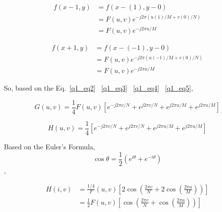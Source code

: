 \documentclass[12pt]{article}
\begin{document}
\begin{enumerate}[leftmargin=\labelsep]
\begin{enumerate}
        \begin{equation}
            \begin{aligned}
                f(x -1, y) 
                &= f(x-(1), y-0)\\
                &= F(u, v)e^{-j2\pi(u(1)/M + v(0)/N)}\\
                &= F(u, v)e^{-j2\pi u/M}
            \label{q1_eq4}
            \end{aligned}
        \end{equation}


        \begin{equation}
            \begin{aligned}
                f(x +1, y) 
                &= f(x-(-1), y-0)\\
                &= F(u, v)e^{-j2\pi(u(-1)/M + v(0)/N)}\\
                &= F(u, v)e^{-j2\pi u/M}
            \label{q1_eq5}
            \end{aligned}
        \end{equation}
        
        So, based on the Eq.~\ref{q1_eq2} ~\ref{q1_eq3} ~\ref{q1_eq4} ~\ref{q1_eq5}, 

        \begin{equation}
            G(u, v) = \frac{1}{4} F(u, v) [e^{-j2\pi v/N} + e^{j2\pi v/N} + e^{j2\pi u/M} + e^{j2\pi u/M}]
        \end{equation}

        \begin{equation}
            H(u, v) = \frac{1}{4} [e^{-j2\pi v/N} + e^{j2\pi v/N} + e^{j2\pi u/M} + e^{j2\pi u/M}]
        \end{equation}

        Based on the Euler's Formula, $$\cos \theta = \frac{1}{2}(e^{i \theta} + e^{-i \theta})$$,

        \begin{equation}
            \begin{aligned}
                H(i, v)
                &= \frac{1/4}F(u, v)[2\cos(\frac{2 \pi v}{N} + 2\cos(\frac{2\pi u}{M}))]\\
                &= \frac{1}{2}F(u, v)[\cos(\frac{2 \pi v}{N} + \cos(\frac{2\pi u}{M}))]
            \end{aligned}
        \end{equation}

    \vspace*{1em}
    \end{enumerate}


\end{enumerate}
\end{document}
